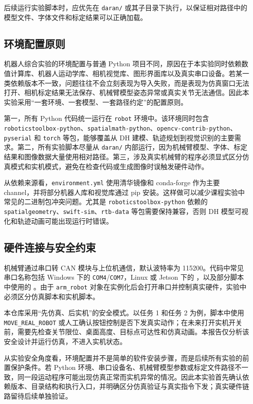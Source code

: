 后续运行实验脚本时，应优先在 \texttt{daran/} 或其子目录下执行，以保证相对路径中的模型文件、字体文件和标定结果可以正确加载。

\subsection{环境配置原则}

机器人综合实验的环境配置与普通 Python 项目不同，原因在于本实验同时依赖数值计算库、机器人运动学库、相机视觉库、图形界面库以及真实串口设备。若某一类依赖版本不一致，问题往往不会立刻表现为导入失败，而是表现为仿真窗口无法打开、相机标定结果无法保存、机械臂模型姿态异常或真实关节无法通信。因此本实验采用“一套环境、一套模型、一套路径约定”的配置原则。

第一，所有 Python 代码统一运行在 \texttt{robot} 环境中。该环境同时包含 \texttt{roboticstoolbox-python}、\texttt{spatialmath-python}、\texttt{opencv-contrib-python}、\texttt{pyserial} 和 \texttt{torch} 等包，能够覆盖从 DH 建模、轨迹规划到视觉识别的主要需求。第二，所有实验脚本尽量从 \texttt{daran/} 内部运行，因为机械臂模型、字体、标定结果和图像数据大量使用相对路径。第三，涉及真实机械臂的程序必须显式区分仿真模式和实机模式，避免在检查代码或生成图像时误触发硬件动作。

从依赖来源看，\texttt{environment.yml} 使用清华镜像和 conda-forge 作为主要 channel，并将部分机器人库和视觉库通过 pip 安装。这样做可以减少课程实验中常见的二进制包冲突问题。尤其是 \texttt{roboticstoolbox-python} 依赖的 \texttt{spatialgeometry}、\texttt{swift-sim}、\texttt{rtb-data} 等包需要保持兼容，否则 DH 模型可视化和轨迹动画可能出现运行时错误。

\subsection{硬件连接与安全约束}

机械臂通过串口转 CAN 模块与上位机通信，默认波特率为 115200。代码中常见串口名称包括 Windows 下的 \texttt{COM4}/\texttt{COM7}，Linux 或 Jetson 下的 ，以及部分脚本中使用的 。由于 \texttt{arm\_robot} 对象在实例化后会打开串口并控制真实硬件，实验中必须区分仿真脚本和实机脚本。

本仓库采用“先仿真、后实机”的安全模式。以任务 1 和任务 2 为例，脚本中使用 \texttt{MOVE\_REAL\_ROBOT} 或人工确认按钮控制是否下发真实动作；在未来打开实机开关前，需要先检查关节限位、桌面高度、目标点可达性和仿真动画。本报告仅分析该安全设计并运行仿真，不进入实机状态。

从实验安全角度看，环境配置并不是简单的软件安装步骤，而是后续所有实验的前置保护条件。若 Python 环境、串口设备名、机械臂模型参数或标定文件路径不一致，同一段运动程序可能出现仿真正常而实机异常的情况。因此本实验首先确认依赖版本、目录结构和执行入口，并明确区分仿真验证与真实指令下发；真实硬件链路留待后续单独验证。


